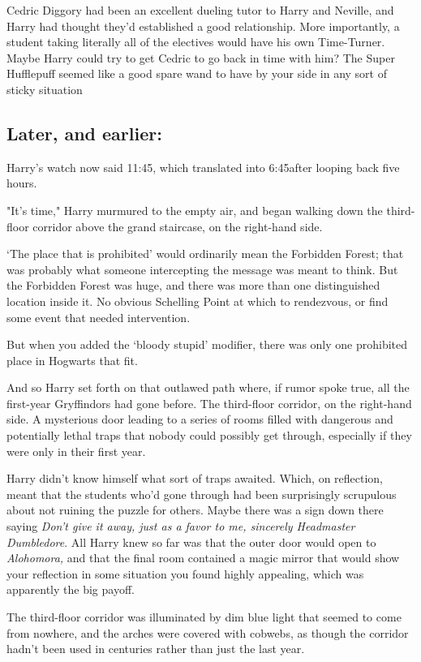 Cedric Diggory had been an excellent dueling tutor to Harry and Neville, and
Harry had thought they'd established a good relationship. More importantly, a
student taking literally all of the electives would have his own Time-Turner.
Maybe Harry could try to get Cedric to go back in time with him? The Super
Hufflepuff seemed like a good spare wand to have by your side in any sort of
sticky situation{\el}
\sbreak
\vspace{-2\baselineskip}
\subsection{Later, and earlier:}

Harry's watch now said 11:45, which translated into 6:45\PM after looping back
five hours.

"It's time," Harry murmured to the empty air, and began walking down the
third-floor corridor above the grand staircase, on the right-hand side.

`The place that is prohibited' would ordinarily mean the Forbidden Forest; that
was probably what someone intercepting the message was meant to think. But the
Forbidden Forest was huge, and there was more than one distinguished location
inside it. No obvious Schelling Point at which to rendezvous, or find some
event that needed intervention.

But when you added the `bloody stupid' modifier, there was only one prohibited
place in Hogwarts that fit.

And so Harry set forth on that outlawed path where, if rumor spoke true, all
the first-year Gryffindors had gone before. The third-floor corridor, on the
right-hand side. A mysterious door leading to a series of rooms filled with
dangerous and potentially lethal traps that nobody could possibly get through,
especially if they were only in their first year.

Harry didn't know himself what sort of traps awaited. Which, on reflection,
meant that the students who'd gone through had been surprisingly scrupulous
about not ruining the puzzle for others. Maybe there was a sign down there
saying \emph{Don't give it away, just as a favor to me, sincerely Headmaster
Dumbledore}. All Harry knew so far was that the outer door would open to
\emph{Alohomora,} and that the final room contained a magic mirror that would
show your reflection in some situation you found highly appealing, which was
apparently the big payoff.

The third-floor corridor was illuminated by dim blue light that seemed to come
from nowhere, and the arches were covered with cobwebs, as though the corridor
hadn't been used in centuries rather than just the last year.

